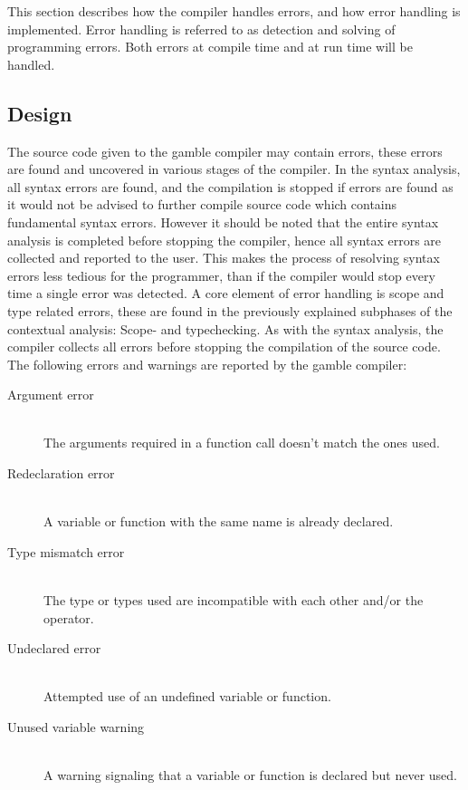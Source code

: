 This section describes how the compiler handles errors, and how error handling is implemented.
Error handling is referred to as detection and solving of programming errors. 
Both errors at compile time and at run time will be handled.
\subsection*{Design}\label{subsec:DesignErrorHandling}
The source code given to the \gls{gamble} compiler may contain errors, these errors are found and uncovered in various stages of the compiler.   
In the syntax analysis, all syntax errors are found, and the compilation is stopped if errors are found as it would not be advised to further compile source code which contains fundamental syntax errors.
However it should be noted that the entire syntax analysis is completed before stopping the compiler, hence all syntax errors are collected and reported to the user.
This makes the process of resolving syntax errors less tedious for the programmer, than if the compiler would stop every time a single error was detected. 
A core element of error handling is scope and type related errors, these are found in the previously explained subphases of the contextual analysis: Scope- and typechecking.
As with the syntax analysis, the compiler collects all errors before stopping the compilation of the source code. 
The following errors and warnings are reported by the \gls{gamble} compiler:
\begin{description}
	\item[Argument error]\hfill\\ 
	The arguments required in a function call doesn't match the ones used.
	\item[Redeclaration error]\hfill\\ 
	A variable or function with the same name is already declared.
	\item[Type mismatch error]\hfill\\ 
	The type or types used are incompatible with each other and/or the operator. 
	\item[Undeclared error]\hfill\\ 
	Attempted use of an undefined variable or function.
	\item[Unused variable warning]\hfill\\ 
	A warning signaling that a variable or function is declared but never used.
\end{description} 
